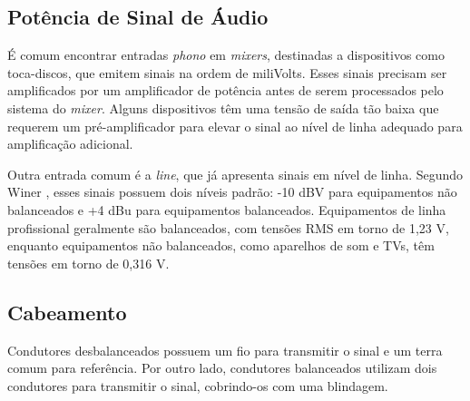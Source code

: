 
\subsection{Potência de Sinal de Áudio}

É comum encontrar entradas \textit{phono} em \textit{mixers}, destinadas a dispositivos como toca-discos, que emitem sinais na ordem de miliVolts. Esses sinais precisam ser amplificados por um amplificador de potência antes de serem processados pelo sistema do \textit{mixer}. Alguns dispositivos têm uma tensão de saída tão baixa que requerem um pré-amplificador para elevar o sinal ao nível de linha adequado para amplificação adicional.

Outra entrada comum é a \textit{line}, que já apresenta sinais em nível de linha. Segundo Winer \cite{winer}, esses sinais possuem dois níveis padrão: -10 dBV para equipamentos não balanceados e +4 dBu para equipamentos balanceados. Equipamentos de linha profissional geralmente são balanceados, com tensões RMS em torno de 1,23 V, enquanto equipamentos não balanceados, como aparelhos de som e TVs, têm tensões em torno de 0,316 V.

\subsection{Cabeamento}

Condutores desbalanceados possuem um fio para transmitir o sinal e um terra comum para referência.
Por outro lado, condutores balanceados utilizam dois condutores para transmitir o sinal, cobrindo-os com uma blindagem. 

